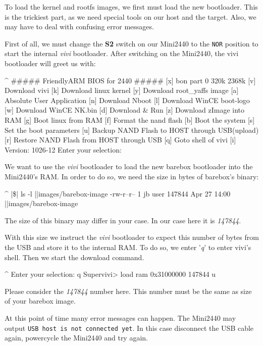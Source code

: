 To load the kernel and rootfs images, we first must load the new bootloader.
This is the trickiest part, as we need special tools on our host and the target.
Also, we may have to deal with confusing error messages.

First of all, we must change the \textbf{S2} switch on our Mini2440
to the \texttt{NOR} position to start the internal \textit{vivi} bootloader.
After switching on the Mini2440, the vivi bootloader will greet us
with:

\begin{ptxshell}[escapechar=|]{^}
##### FriendlyARM BIOS for 2440 #####
[x] bon part 0 320k 2368k
[v] Download vivi
[k] Download linux kernel
[y] Download root_yaffs image
[a] Absolute User Application
[n] Download Nboot
[l] Download WinCE boot-logo
[w] Download WinCE NK.bin
[d] Download & Run
[z] Download zImage into RAM
[g] Boot linux from RAM
[f] Format the nand flash
[b] Boot the system
[s] Set the boot parameters
[u] Backup NAND Flash to HOST through USB(upload)
[r] Restore NAND Flash from HOST through USB
[q] Goto shell of vivi
[i] Version: 1026-12
Enter your selection:
\end{ptxshell}

We want to use the \textit{vivi} bootloader to load the new barebox bootloader
into the Mini2440's RAM. In order to do so, we need the size in bytes of
barebox's binary:

\begin{ptxshell}[escapechar=|]{^}
|\$| ls -l |\ptxdistPlatformDir |images/barebox-image
-rw-r--r-- 1 jb user 147844 Apr 27 14:00 |\ptxdistPlatformDir |images/barebox-image
\end{ptxshell}

The size of this binary may differ in your case. In our case here it is
\textit{147844}.

With this size we instruct the \textit{vivi} bootloader to expect this number of
bytes from the USB and store it to the internal RAM. To do so, we enter
'\textit{q}' to enter vivi's shell. Then we start the download command.

\begin{ptxshell}[escapechar=|]{^}
Enter your selection: q
Supervivi> load ram 0x31000000 147844 u
\end{ptxshell}

Please consider the \textit{147844} number here. This number must be the same
as size of your barebox image.

At this point of time many error messages can happen. The Mini2440
may output \texttt{USB host is not connected yet}. In this case disconnect
the USB cable again, powercycle the Mini2440 and try again.

